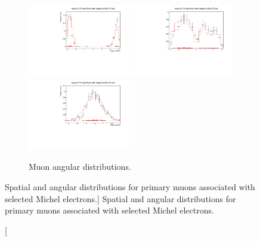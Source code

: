 \begin{figure}
	\begin{subfigure}[b]{\textwidth}
		\centering
		\includegraphics[width=0.49\textwidth]{figures/DataVMC_angle_xy.pdf}
		\hfill
		\includegraphics[width=0.49\textwidth]{figures/DataVMC_angle_xz.pdf}
		\includegraphics[width=0.49\textwidth]{figures/DataVMC_angle_yz.pdf}
		\caption {Muon angular distributions.}
		\label{fig:muon_angles}
	\end{subfigure}
	

	\caption
	[Spatial and angular distributions for primary muons associated with selected
	Michel electrons.]
	{ Spatial and angular distributions for primary muons associated with selected
	Michel electrons. }

	\label{fig:muon_distributions}

\end{figure}


